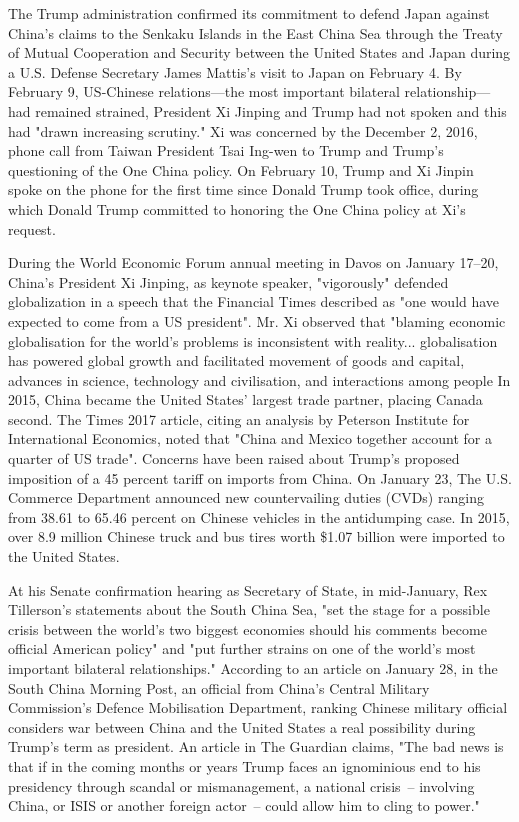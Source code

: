 The Trump administration confirmed its commitment to defend Japan
against China's claims to the Senkaku Islands in the East China Sea
through the Treaty of Mutual Cooperation and Security between the United
States and Japan during a U.S. Defense Secretary James Mattis's visit to
Japan on February 4. By February 9, US-Chinese relations---the most
important bilateral relationship---had remained strained, President Xi
Jinping and Trump had not spoken and this had "drawn increasing
scrutiny." Xi was concerned by the December 2, 2016, phone call from
Taiwan President Tsai Ing-wen to Trump and Trump's questioning of the
One China policy. On February 10, Trump and Xi Jinpin spoke on the phone
for the first time since Donald Trump took office, during which Donald
Trump committed to honoring the One China policy at Xi's request.

During the World Economic Forum annual meeting in Davos on January
17--20, China's President Xi Jinping, as keynote speaker, "vigorously"
defended globalization in a speech that the Financial Times described as
"one would have expected to come from a US president". Mr. Xi observed
that "blaming economic globalisation for the world's problems is
inconsistent with reality... globalisation has powered global growth and
facilitated movement of goods and capital, advances in science,
technology and civilisation, and interactions among people In 2015,
China became the United States' largest trade partner, placing Canada
second. The Times 2017 article, citing an analysis by Peterson Institute
for International Economics, noted that "China and Mexico together
account for a quarter of US trade". Concerns have been raised about
Trump's proposed imposition of a 45 percent tariff on imports from
China. On January 23, The U.S. Commerce Department announced new
countervailing duties (CVDs) ranging from 38.61 to 65.46 percent on
Chinese vehicles in the antidumping case. In 2015, over 8.9 million
Chinese truck and bus tires worth \$1.07 billion were imported to the
United States.

At his Senate confirmation hearing as Secretary of State, in
mid-January, Rex Tillerson's statements about the South China Sea, "set
the stage for a possible crisis between the world's two biggest
economies should his comments become official American policy" and "put
further strains on one of the world's most important bilateral
relationships." According to an article on January 28, in the South
China Morning Post, an official from China's Central Military
Commission's Defence Mobilisation Department, ranking Chinese military
official considers war between China and the United States a real
possibility during Trump's term as president. An article in The Guardian
claims, "The bad news is that if in the coming months or years Trump
faces an ignominious end to his presidency through scandal or
mismanagement, a national crisis~-- involving China, or ISIS or another
foreign actor~-- could allow him to cling to power."

